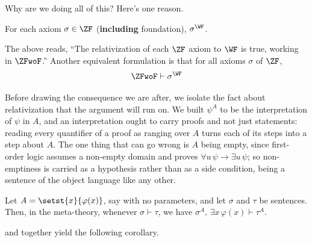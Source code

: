 Why are we doing all of this? Here's one reason.

\begin{boxtheorem} \label{Ch2:Thm:ZF_Relativizes_To_WF}
    For each axiom $\sigma \in \ZF$ (\textbf{including} foundation), $\sigma^{\WF}$.
\end{boxtheorem}
The above reads, ``The relativization of each $\ZF$ axiom to $\WF$ is true, working in $\ZFwoF$.'' Another equivalent formulation is that for all axioms $\sigma$ of $\ZF$,
\begin{align}
    \ZFwoF \vdash \sigma^{\WF}
\end{align}

Before drawing the consequence we are after, we isolate the fact about relativization that the argument will run on. We built $\psi^A$ to be the interpretation of $\psi$ in $A$, and an interpretation ought to carry proofs and not just statements: reading every quantifier of a proof as ranging over $A$ turns each of its steps into a step about $A$. The one thing that can go wrong is $A$ being empty, since first-order logic assumes a non-empty domain and proves $\forall u \, \psi \to \exists u \, \psi$; so non-emptiness is carried as a hypothesis rather than as a side condition, being a sentence of the object language like any other.

\begin{boxlemma}[Scheme] \label{Ch2:Lemma:Relativization_Preserves_Proofs}
    Let $A = \setst{x}{\varphi(x)}$, say with no parameters, and let $\sigma$ and $\tau$ be sentences. Then, in the meta-theory, whenever $\sigma \vdash \tau$, we have $\sigma^A, \, \exists x \, \varphi(x) \vdash \tau^A$.
\end{boxlemma}

 and  together yield the following corollary.

